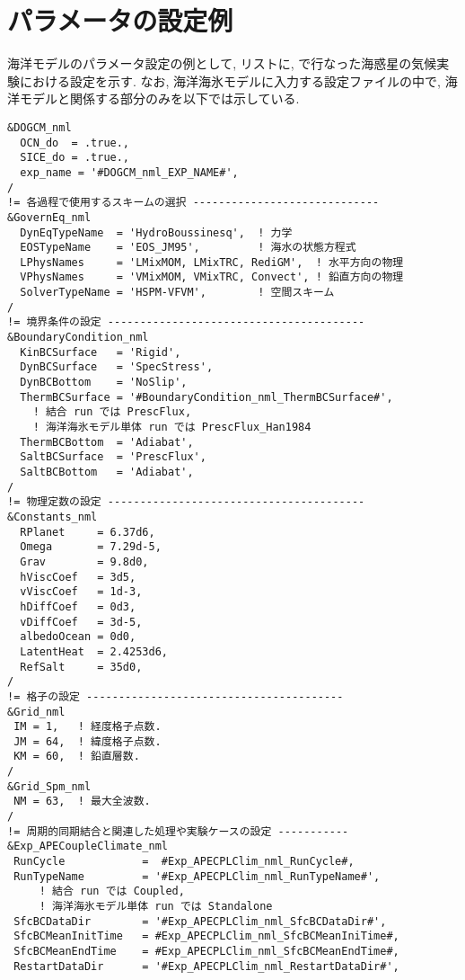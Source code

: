 \section{パラメータの設定例}\label{model_ogcm_parameters}
海洋モデルのパラメータ設定の例として, リスト\cite{dogcm_Pl64L60_conf}に, 
\cite{ykawai2018_Dthesis}で行なった海惑星の気候実験における設定を示す. 
なお, 海洋海氷モデルに入力する設定ファイルの中で, 海洋モデルと関係する部分のみを以下では示している.
\begin{lstlisting}[caption={
海洋モデルの設定ファイルのテンプレート.
ただし, \#var\#のように書かれた部分は実験ケース等ごとに適切な値が入る.
},label={dogcm_Pl64L60_conf},
basicstyle=\ttfamily\footnotesize,
frame=single]
&DOGCM_nml
  OCN_do  = .true.,
  SICE_do = .true.,
  exp_name = '#DOGCM_nml_EXP_NAME#',
/
!= 各過程で使用するスキームの選択 -----------------------------
&GovernEq_nml
  DynEqTypeName  = 'HydroBoussinesq',  ! 力学
  EOSTypeName    = 'EOS_JM95',         ! 海水の状態方程式
  LPhysNames     = 'LMixMOM, LMixTRC, RediGM',  ! 水平方向の物理
  VPhysNames     = 'VMixMOM, VMixTRC, Convect', ! 鉛直方向の物理 
  SolverTypeName = 'HSPM-VFVM',        ! 空間スキーム
/
!= 境界条件の設定 ----------------------------------------
&BoundaryCondition_nml
  KinBCSurface   = 'Rigid',
  DynBCSurface   = 'SpecStress',
  DynBCBottom    = 'NoSlip',
  ThermBCSurface = '#BoundaryCondition_nml_ThermBCSurface#',
    ! 結合 run では PrescFlux, 
    ! 海洋海氷モデル単体 run では PrescFlux_Han1984
  ThermBCBottom  = 'Adiabat', 
  SaltBCSurface  = 'PrescFlux',
  SaltBCBottom   = 'Adiabat', 
/
!= 物理定数の設定 ----------------------------------------
&Constants_nml
  RPlanet     = 6.37d6,
  Omega       = 7.29d-5, 
  Grav        = 9.8d0, 
  hViscCoef   = 3d5,
  vViscCoef   = 1d-3,
  hDiffCoef   = 0d3,
  vDiffCoef   = 3d-5, 
  albedoOcean = 0d0,
  LatentHeat  = 2.4253d6,
  RefSalt     = 35d0, 
/
!= 格子の設定 ----------------------------------------
&Grid_nml
 IM = 1,   ! 経度格子点数.
 JM = 64,  ! 緯度格子点数. 
 KM = 60,  ! 鉛直層数.
/
&Grid_Spm_nml
 NM = 63,  ! 最大全波数.
/
!= 周期的同期結合と関連した処理や実験ケースの設定 -----------
&Exp_APECoupleClimate_nml
 RunCycle            =  #Exp_APECPLClim_nml_RunCycle#, 
 RunTypeName         = '#Exp_APECPLClim_nml_RunTypeName#', 
     ! 結合 run では Coupled, 
     ! 海洋海氷モデル単体 run では Standalone
 SfcBCDataDir        = '#Exp_APECPLClim_nml_SfcBCDataDir#', 
 SfcBCMeanInitTime   = #Exp_APECPLClim_nml_SfcBCMeanIniTime#, 
 SfcBCMeanEndTime    = #Exp_APECPLClim_nml_SfcBCMeanEndTime#,
 RestartDataDir      = '#Exp_APECPLClim_nml_RestartDataDir#', 

\end{lstlisting}
